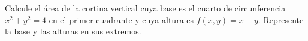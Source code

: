 Calcule el área de la cortina vertical cuya base es el cuarto de circunferencia $x^2+y^2=4$ en el primer cuadrante y cuya altura es $f(x,y)=x+y$. Represente la base y las alturas en sus extremos.
